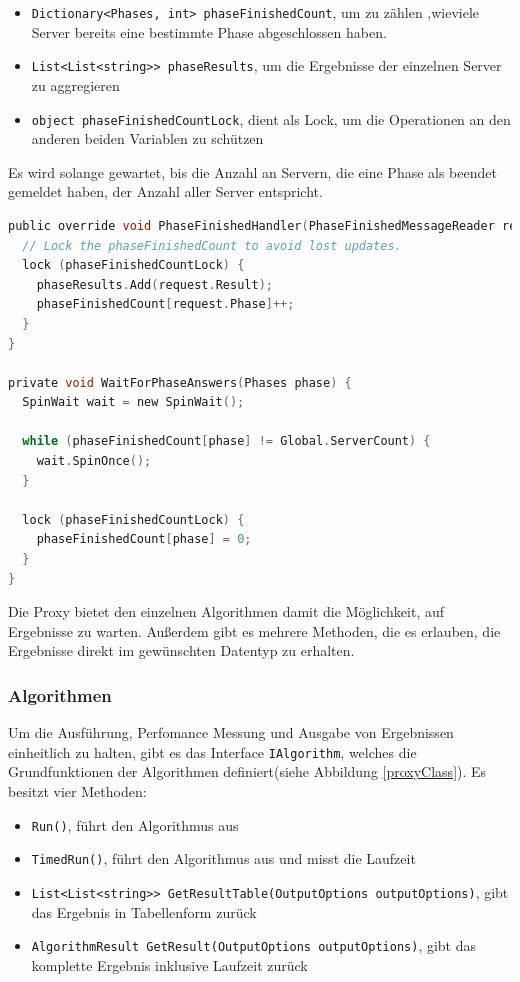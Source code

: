 \begin{itemize}
  \item \verb|Dictionary<Phases, int> phaseFinishedCount|, um zu zählen ,wieviele Server bereits eine bestimmte Phase abgeschlossen haben.
  \item \verb|List<List<string>> phaseResults|, um die Ergebnisse der einzelnen Server zu aggregieren
  \item \verb|object phaseFinishedCountLock|, dient als Lock, um die Operationen an den anderen beiden Variablen zu schützen
\end{itemize}

Es wird solange gewartet, bis die Anzahl an Servern, die eine Phase als beendet gemeldet haben, der Anzahl aller Server entspricht.

\begin{lstlisting}[language=c, caption={Implementierung des Mechanismus, um auf Phasen zu warten.}]
public override void PhaseFinishedHandler(PhaseFinishedMessageReader request) {
  // Lock the phaseFinishedCount to avoid lost updates.
  lock (phaseFinishedCountLock) {
    phaseResults.Add(request.Result);
    phaseFinishedCount[request.Phase]++;
  }
}

private void WaitForPhaseAnswers(Phases phase) {
  SpinWait wait = new SpinWait();

  while (phaseFinishedCount[phase] != Global.ServerCount) {
    wait.SpinOnce();
  }

  lock (phaseFinishedCountLock) {
    phaseFinishedCount[phase] = 0;
  }
}
\end{lstlisting}

Die Proxy bietet den einzelnen Algorithmen damit die Möglichkeit, auf Ergebnisse zu warten. Außerdem gibt es mehrere Methoden, die es erlauben, die Ergebnisse direkt im gewünschten Datentyp zu erhalten.

\subsubsection{Algorithmen}

Um die Ausführung, Perfomance Messung und Ausgabe von Ergebnissen einheitlich zu halten, gibt es das Interface \verb|IAlgorithm|, welches die Grundfunktionen der Algorithmen definiert(siehe Abbildung \ref{proxyClass}).
Es besitzt vier Methoden:

\begin{itemize}
  \item \verb|Run()|, führt den Algorithmus aus
  \item \verb|TimedRun()|, führt den Algorithmus aus und misst die Laufzeit
  \item \verb|List<List<string>> GetResultTable(OutputOptions outputOptions)|, gibt das Ergebnis in Tabellenform zurück
  \item \verb|AlgorithmResult GetResult(OutputOptions outputOptions)|, gibt das komplette Ergebnis inklusive Laufzeit zurück
\end{itemize}

